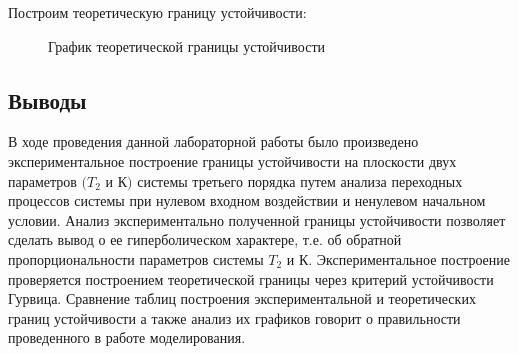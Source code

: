 \documentclass[a4paper, 11pt]{article}
\begin{document}
\par 
Построим теоретическую границу устойчивости:

\begin{figure}[h!]
\caption{График теоретической границы устойчивости}
\label{ris:image}
\end{figure}

\newpage
\begin{center}
\section*{Выводы}
\end{center}
\par 
В ходе проведения данной лабораторной работы было произведено экспериментальное построение границы устойчивости на плоскости двух параметров $(T_2$ и $К)$ системы третьего порядка путем анализа переходных процессов системы при нулевом входном воздействии и ненулевом начальном условии. Анализ экспериментально полученной границы устойчивости позволяет сделать вывод о ее гиперболическом характере, т.е. об обратной пропорциональности параметров системы  $T_2$ и $К$. Экспериментальное построение проверяется построением теоретической границы через критерий устойчивости Гурвица. Сравнение таблиц построения экспериментальной и теоретических границ устойчивости а также анализ их графиков говорит о правильности проведенного в работе моделирования.   
\end{document}
